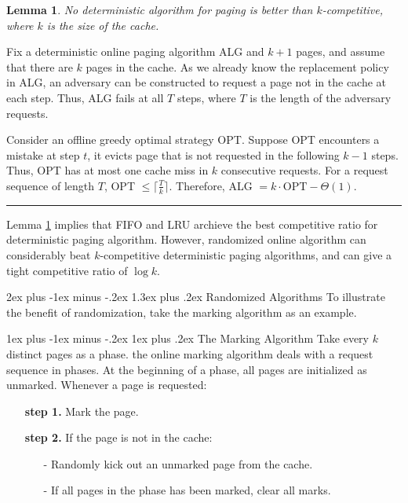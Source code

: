 \documentclass[11pt]{article}
\makeatletter
\renewcommand{\section}{\@startsection{section}{1}{0mm}%
                                 {2ex plus -1ex minus -.2ex}%
                                 {1.3ex plus .2ex}%
                                 {\normalfont\Large\bfseries}}%
\renewcommand{\subsection}{\@startsection{subsection}{2}{0mm}%
                                   {1ex plus -1ex minus -.2ex}%
                                   {1ex plus .2ex}%
                                   {\normalfont\large\bfseries}}%
\newenvironment{proof}{{\bf Proof:  }}{\hfill\rule{2mm}{2mm}}
\newtheorem{lemma}[fact]{Lemma}
\makeatother
\begin{document}
\begin{lemma}
	No deterministic algorithm for paging is better than $k$-competitive, where $k$ is the size of the cache\cite{albers1996competitive}.
	\label{lemma2}
\end{lemma}

\begin{proof}
	Fix a deterministic online paging algorithm ALG and $k+1$ pages, and assume that there are $k$ pages in the cache. As we already know the replacement policy in ALG, an adversary can be constructed to request a page not in the cache at each step. Thus, ALG fails at all $T$ steps, where $T$ is the length of the adversary requests.
	
	Consider an offline greedy optimal strategy OPT. Suppose OPT encounters a mistake at step $t$, it evicts page that is not requested in the following $k-1$ steps. Thus, OPT has at most one cache miss in $k$ consecutive requests. For a request sequence of length $T$, OPT $\le \lceil \frac{T}{k} \rceil$. Therefore, ALG $=k\cdot \text{OPT} - \Theta(1)$.
\end{proof}

Lemma \ref{lemma2} implies that FIFO and LRU archieve the best competitive ratio for deterministic paging algorithm. However, randomized online algorithm can considerably beat $k$-competitive deterministic paging algorithms, and can give a tight competitive ratio of $\log k$.

\section{Randomized Algorithms}
To illustrate the benefit of randomization, take the marking algorithm as an example.

\subsection{The Marking Algorithm}
Take every $k$ distinct pages as a phase. the online marking algorithm deals with a request sequence in phases. At the beginning of a phase, all pages are initialized as unmarked. Whenever a page is requested:
\begin{enumerate}[itemindent=2em]
	\item[{\bf step 1.}] Mark the page.
	\item[{\bf step 2.}] If the page is not in the cache:
	\begin{itemize}
		\item[-] Randomly kick out an unmarked page from the cache.
		\item[-] If all pages in the phase has been marked, clear all marks.
	\end{itemize}
\end{enumerate}
\end{document}
